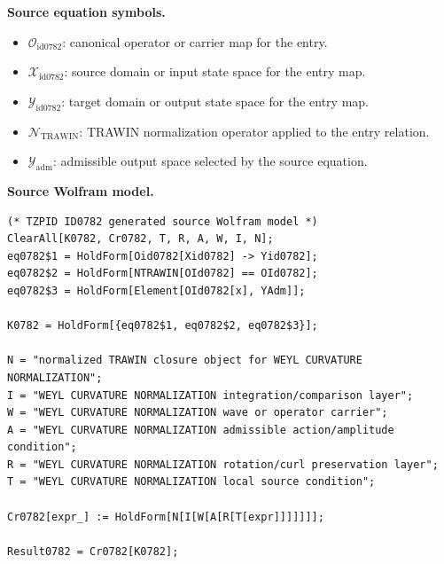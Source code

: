 \begin{minipage}[t]{0.49\linewidth}
\begingroup
\small
\raggedright
\textbf{Source equation symbols.}\par
\begin{itemize}[leftmargin=1.35em,itemsep=1pt,topsep=1pt,parsep=0pt]
    \item $\mathcal{O}_{\mathrm{id0782}}$: canonical operator or carrier map for the entry.
    \item $\mathcal{X}_{\mathrm{id0782}}$: source domain or input state space for the entry map.
    \item $\mathcal{Y}_{\mathrm{id0782}}$: target domain or output state space for the entry map.
    \item $\mathcal{N}_{\mathrm{TRAWIN}}$: TRAWIN normalization operator applied to the entry relation.
    \item $\mathcal{Y}_{\mathrm{adm}}$: admissible output space selected by the source equation.
\end{itemize}
\endgroup
\end{minipage}\hfill
\begin{minipage}[t]{0.47\linewidth}
\begingroup
\scriptsize
\raggedright
\textbf{Source Wolfram model.}\par
\begin{Verbatim}[fontsize=\tiny,breaklines=true,breakanywhere=true]
(* TZPID ID0782 generated source Wolfram model *)
ClearAll[K0782, Cr0782, T, R, A, W, I, N];
eq0782$1 = HoldForm[Oid0782[Xid0782] -> Yid0782];
eq0782$2 = HoldForm[NTRAWIN[OId0782] == OId0782];
eq0782$3 = HoldForm[Element[OId0782[x], YAdm]];

K0782 = HoldForm[{eq0782$1, eq0782$2, eq0782$3}];

N = "normalized TRAWIN closure object for WEYL CURVATURE NORMALIZATION";
I = "WEYL CURVATURE NORMALIZATION integration/comparison layer";
W = "WEYL CURVATURE NORMALIZATION wave or operator carrier";
A = "WEYL CURVATURE NORMALIZATION admissible action/amplitude condition";
R = "WEYL CURVATURE NORMALIZATION rotation/curl preservation layer";
T = "WEYL CURVATURE NORMALIZATION local source condition";

Cr0782[expr_] := HoldForm[N[I[W[A[R[T[expr]]]]]]];

Result0782 = Cr0782[K0782];
\end{Verbatim}
\endgroup
\end{minipage}

